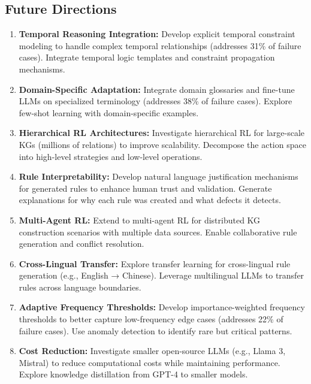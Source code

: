 \documentclass[runningheads]{llncs}
\begin{document}
\subsection{Future Directions}

\begin{enumerate}
    \item \textbf{Temporal Reasoning Integration:} Develop explicit temporal constraint modeling to handle complex temporal relationships (addresses 31\% of failure cases). Integrate temporal logic templates and constraint propagation mechanisms.

    \item \textbf{Domain-Specific Adaptation:} Integrate domain glossaries and fine-tune LLMs on specialized terminology (addresses 38\% of failure cases). Explore few-shot learning with domain-specific examples.

    \item \textbf{Hierarchical RL Architectures:} Investigate hierarchical RL for large-scale KGs (millions of relations) to improve scalability. Decompose the action space into high-level strategies and low-level operations.

    \item \textbf{Rule Interpretability:} Develop natural language justification mechanisms for generated rules to enhance human trust and validation. Generate explanations for why each rule was created and what defects it detects.

    \item \textbf{Multi-Agent RL:} Extend to multi-agent RL for distributed KG construction scenarios with multiple data sources. Enable collaborative rule generation and conflict resolution.

    \item \textbf{Cross-Lingual Transfer:} Explore transfer learning for cross-lingual rule generation (e.g., English → Chinese). Leverage multilingual LLMs to transfer rules across language boundaries.

    \item \textbf{Adaptive Frequency Thresholds:} Develop importance-weighted frequency thresholds to better capture low-frequency edge cases (addresses 22\% of failure cases). Use anomaly detection to identify rare but critical patterns.

    \item \textbf{Cost Reduction:} Investigate smaller open-source LLMs (e.g., Llama 3, Mistral) to reduce computational costs while maintaining performance. Explore knowledge distillation from GPT-4 to smaller models.
\end{enumerate}
\end{document}
